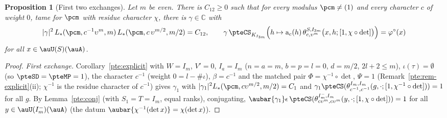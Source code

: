 \documentclass[10pt]{amsart}
\newtheorem{proposition}[theorem]{Proposition}
\theoremstyle{definition}
\theoremstyle{remark}
\newcommand{\C}{\mathbb C}
\begin{document}
\begin{proposition}[First two exchanges]\label{pte:carrier}
Let $m$ be even. There is $C_{12}\ge0$ such that for every modulus $\pcm\ne(1)$ and every character $c$
of weight $0$, tame for $\pcm$ with residue character $\chi$, there is $\gamma\in\C$ with
\[
|\gamma|^2\,L_*(\pcm,c^{-1}\upsilon^m,m)\,L_*(\pcm,c\,\upsilon^{m/2},m/2)=C_{12},\qquad
\gamma\,\pteCS_{K_{I_{3m}}}\Bigl(h\mapsto\mathrm a_c(h)\,\theta^{S,I_{3m}}_{c,\upsilon^m}\bigl(x,h;[1,\chi\circ
\det]\bigr)\Bigr)=\varphi^\circ(x)
\]
for all $x\in\auU(S)(\auA)$.
\end{proposition}
\begin{proof}
\emph{First exchange.} Corollary~\ref{pte:explicit} with $W=I_m$, $V'=0$, $I_a=I_m$ ($n=a=m$, $b=p=l=0$,
$d=m/2$, $2l+2\le m$), $\iota(\tau)=\emptyset$ (so $\pteSD=\pteMP=1$), the character $c^{-1}$ (weight
$0=l-\#\iota$), $\beta=c^{-1}$ and the matched pair $\Phi=\chi^{-1}\circ\det$, $\Psi=1$ (Remark~\ref{pte:rem-explicit}(ii);
$\chi^{-1}$ is the residue character of $c^{-1}$) gives $\gamma_1$ with $|\gamma_1|^2L_*(\pcm,c\upsilon^{m/2},m/2)=
C_1$ and $\gamma_1\pteCS(\theta^{I_m,I_m}_{c^{-1},c^{-1}}(g,\cdot;[1,\chi^{-1}\circ\det]))=1$ for all $g$.
By Lemma~\ref{pte:conj} (with $S_1=T=I_m$, equal ranks), conjugating, $\aubar{\gamma_1}\epsilon\,\pteCS(\theta^{I_m^-,
I_m}_{c\upsilon^m,c\upsilon^m}(y,\cdot;[1,\chi\circ\det]))=1$ for all $y\in\auU(I_m^-)(\auA)$ (the datum
$\aubar{\chi^{-1}(\det x)}=\chi(\det x)$).


\end{proof}
\end{document}

